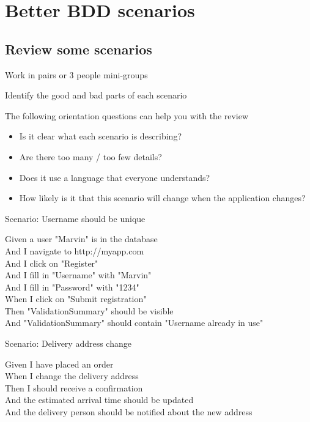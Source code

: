 \chapter*{Better BDD scenarios}

\ifnotes

\fi

\ifcontent
    \section*{Review some scenarios}
    Work in pairs or 3 people mini-groups
    
    Identify the good and bad parts of each scenario
    
    The following orientation questions can help you with the review
    
    \begin{itemize}
        \item Is it clear what each scenario is describing?
        \item Are there too many / too few details?
        \item Does it use a language that everyone understands?
        \item How likely is it that this scenario will change when the application changes?
    \end{itemize}
    
    \begin{framed}
        Scenario: Username should be unique
        
        \begin{adjustwidth}{1cm}{}
            Given a user "Marvin" is in the database \\
            And I navigate to http://myapp.com \\
            And I click on "Register" \\
            And I fill in "Username" with "Marvin" \\
            And I fill in "Password" with "1234" \\
            When I click on "Submit registration" \\
            Then "ValidationSummary" should be visible \\
            And "ValidationSummary" should contain "Username already in use"
        \end{adjustwidth}
    \end{framed}
    
    \begin{framed}
        Scenario: Delivery address change
        
        \begin{adjustwidth}{1cm}{}
            Given I have placed an order \\
            When I change the delivery address \\
            Then I should receive a confirmation \\
            And the estimated arrival time should be updated \\
            And the delivery person should be notified about the new address
        \end{adjustwidth}
    \end{framed}
    
